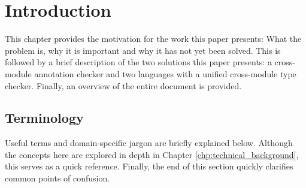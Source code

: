 \documentclass[a4paper,12pt,twoside,openright]{report}
\begin{document}
\pagestyle{empty}
\singlespacing

\onehalfspacing

\singlespacing


\setcounter{page}{0}
\pagestyle{plain}
\tableofcontents

\onehalfspacing


\chapter{Introduction}
\setcounter{page}{1}

This chapter provides the motivation for the work this paper presents: What the
problem is, why it is important and why it has not yet been solved. This is
followed by a brief description of the two solutions this paper presents: a
cross-module annotation checker and two languages with a unified cross-module
type checker. Finally, an overview of the entire document is provided.

\section{Terminology}

Useful terms and domain-specific jargon are briefly explained below. Although
the concepts here are explored in depth in Chapter
\ref{chp:technical_background}, this serves as a quick reference. Finally, the
end of this section quickly clarifies common points of confusion.
\end{document}
